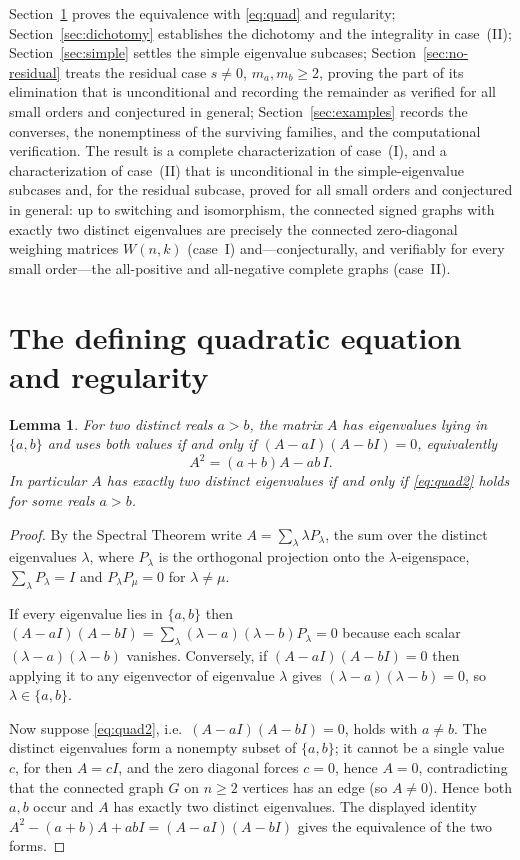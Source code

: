 \documentclass{amsart}
\newtheorem{lemma}{Lemma}
\theoremstyle{definition}
\begin{document}
Section~\ref{sec:quad} proves the equivalence with \eqref{eq:quad} and
regularity; Section~\ref{sec:dichotomy} establishes the dichotomy and the
integrality in case~(II); Section~\ref{sec:simple} settles the simple
eigenvalue subcases; Section~\ref{sec:no-residual} treats the residual case
$s\ne 0$, $m_a,m_b\ge 2$, proving the part of its elimination that is
unconditional and recording the remainder as verified for all small orders and
conjectured in general; Section~\ref{sec:examples} records the converses, the
nonemptiness of the surviving families, and the computational verification.
The result is a complete characterization of case~(I), and a characterization
of case~(II) that is unconditional in the simple-eigenvalue subcases and, for
the residual subcase, proved for all small orders and conjectured in general:
up to switching and isomorphism, the connected signed graphs with exactly two
distinct eigenvalues are precisely the connected zero-diagonal weighing
matrices $W(n,k)$ (case~I) and---conjecturally, and verifiably for every small
order---the all-positive and all-negative complete graphs (case~II).

\section{The defining quadratic equation and regularity}\label{sec:quad}

\begin{lemma}\label{lem:quad}
For two distinct reals $a>b$, the matrix $A$ has eigenvalues lying in
$\{a,b\}$ and uses both values if and only if $(A-aI)(A-bI)=0$, equivalently
\begin{equation}\label{eq:quad2}
A^2=(a+b)A-ab\,I .
\end{equation}
In particular $A$ has exactly two distinct eigenvalues if and only if
\eqref{eq:quad2} holds for some reals $a>b$.
\end{lemma}

\begin{proof}
By the Spectral Theorem write $A=\sum_{\lambda}\lambda P_\lambda$, the sum over
the distinct eigenvalues $\lambda$, where $P_\lambda$ is the orthogonal
projection onto the $\lambda$-eigenspace, $\sum_\lambda P_\lambda=I$ and
$P_\lambda P_\mu=0$ for $\lambda\ne\mu$.

If every eigenvalue lies in $\{a,b\}$ then
$(A-aI)(A-bI)=\sum_\lambda(\lambda-a)(\lambda-b)P_\lambda=0$ because each scalar
$(\lambda-a)(\lambda-b)$ vanishes. Conversely, if $(A-aI)(A-bI)=0$ then
applying it to any eigenvector of eigenvalue $\lambda$ gives
$(\lambda-a)(\lambda-b)=0$, so $\lambda\in\{a,b\}$.

Now suppose \eqref{eq:quad2}, i.e.\ $(A-aI)(A-bI)=0$, holds with $a\ne b$. The
distinct eigenvalues form a nonempty subset of $\{a,b\}$; it cannot be a single
value $c$, for then $A=cI$, and the zero diagonal forces $c=0$, hence $A=0$,
contradicting that the connected graph $G$ on $n\ge2$ vertices has an edge
(so $A\ne0$). Hence both $a,b$ occur and $A$ has exactly two distinct
eigenvalues. The displayed identity
$A^2-(a+b)A+abI=(A-aI)(A-bI)$ gives the equivalence of the two forms.
\end{proof}
\end{document}
